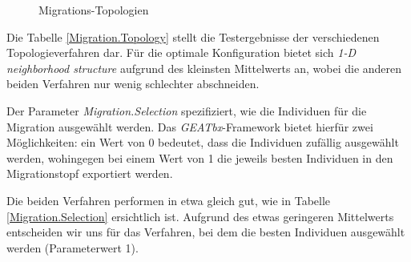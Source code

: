 \begin{figure}[!h] \centering
    \hfill
    \caption{Migrations-Topologien \citep{geatbx-ea}}
    \label{fig.migrationtopology}
\end{figure}



\noindent Die Tabelle \ref{Migration.Topology} stellt die Testergebnisse der
verschiedenen Topologieverfahren dar. Für die optimale Konfiguration bietet sich
\emph{1-D neighborhood structure} aufgrund des kleinsten Mittelwerts an, wobei
die anderen beiden Verfahren nur wenig schlechter abschneiden.


Der Parameter \emph{Migration.Selection} spezifiziert, wie die Individuen für
die Migration ausgewählt werden. Das \emph{GEATbx}-Framework bietet hierfür zwei
Möglichkeiten: ein Wert von 0 bedeutet, dass die Individuen zufällig ausgewählt
werden, wohingegen bei einem Wert von 1 die jeweils besten Individuen in den
Migrationstopf exportiert werden.



\noindent Die beiden Verfahren performen in etwa gleich gut, wie in Tabelle
\ref{Migration.Selection} ersichtlich ist. Aufgrund des etwas geringeren
Mittelwerts entscheiden wir uns für das Verfahren, bei dem die besten Individuen
ausgewählt werden (Parameterwert 1).

